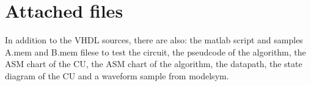 \documentclass[12pt]{article}
\begin{document}
\section*{Attached files}
In addition to the VHDL sources, there are also: the matlab script and samples A.mem and B.mem filese to test the circuit, the pseudcode of the algorithm, the ASM chart of the CU, the ASM chart of the algorithm, the datapath, the state diagram of the CU and a waveform sample from modelsym.
\end{document}

